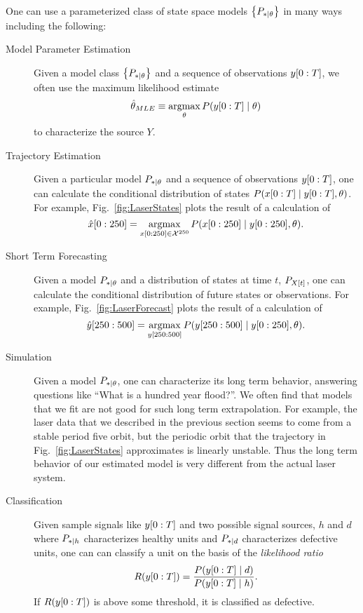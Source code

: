 One can use a parameterized class of state space models $\left\{
  P_{*\mid \theta} \right\}$ in many ways including the following:
\begin{description}
\item[Model Parameter Estimation] Given a model class $\left\{
    P_{*\mid \theta} \right\}$ and a sequence of observations $y[0:T]$,
  we often use the maximum likelihood estimate
  \begin{equation}
    \label{eq:IntroMLE}
    \hat \theta_{MLE} \equiv \operatorname*{argmax}_{\theta} P(y[0:T]\mid \theta)
  \end{equation}
  to characterize the source $Y$.
\item[Trajectory Estimation] Given a particular model $P_{*\mid \theta}$ and
  a sequence of observations $y[0:T]$, one can calculate the
  conditional distribution of states
  $P(x[0:T]\mid y[0:T],\theta)$.  For example,
  Fig.~\ref{fig:LaserStates} plots the result of a calculation of
  \begin{equation*}
    \ts{\hat x}{0}{250} = \argmax_{\ts{x}{0}{250} \in {\cal X}^{250}}
    P(\ts{x}{0}{250}\given \ts{y}{0}{250},\theta).    
  \end{equation*}
\item[Short Term Forecasting] Given a model $P_{*\mid \theta}$ and a
  distribution of states at time $t$, $P_{{X}{[t]}}$, one can
  calculate the conditional distribution of future states or
  observations.  For example, Fig.~\ref{fig:LaserForecast} plots the
  result of a calculation of
  \begin{equation*}
    \hat y[250:500] = \operatorname*{argmax}_{y[250:500]}
    P(y[250:500]\mid y[0:250],\theta).
  \end{equation*}
\item[Simulation] Given a model $P_{*\mid \theta}$, one can characterize its
  long term behavior, answering questions like ``What is a hundred
  year flood?''.  We often find that models that we fit are not good
  for such long term extrapolation.  For example, the laser data that
  we described in the previous section seems to come from a stable
  period five orbit, but the periodic orbit that the trajectory in
  Fig.~\ref{fig:LaserStates} approximates is linearly unstable.  Thus
  the long term behavior of our estimated model is very different from
  the actual laser system.
\item[Classification] Given sample signals like $y[0:T]$ and two
  possible signal sources, $h$ and $d$ where $P_{*\mid h}$
  characterizes healthy units and $P_{*\mid d}$ characterizes defective
  units, one can can classify a unit on the basis of the
  \emph{likelihood ratio}
  \begin{equation*}
    R(y[0:T]) = \frac{P(y[0:T]\mid d)}{P(y[0:T]\mid h)}.
  \end{equation*}
  If $R(y[0:T])$ is above some threshold, it is classified as defective.
\end{description}



